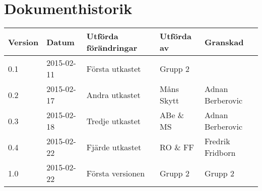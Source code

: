 \documentclass[11pt]{article}
\begin{document}
\section*{Dokumenthistorik}
\begin{table}[h]
\begin{tabular}{|l|l|l|l|l|} \hline

Version & 
Datum & 
Utförda förändringar & 
Utförda av & 
Granskad \\[0.1in] \hline
0.1 &
2015-02-11 & 
Första utkastet & 
Grupp 2 & 
\\ \hline

0.2 &
2015-02-17 & 
Andra utkastet & 
Måns Skytt & 
Adnan Berberovic\\ \hline

0.3 &
2015-02-18 &
Tredje utkastet &
ABe \& MS &
Adnan Berberovic \\ \hline

0.4 &
2015-02-22 &
Fjärde utkastet &
RO \& FF &
Fredrik Fridborn \\ \hline

1.0 &
2015-02-22 &
Första versionen &
Grupp 2 &
Grupp 2 \\ \hline

\end{tabular}
\end{table}


\pagebreak

\end{document}

